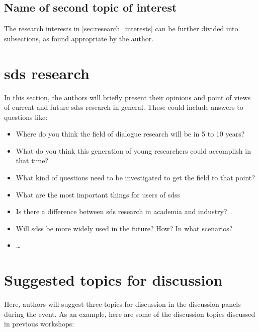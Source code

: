 \documentclass[10pt, a4paper]{article}
\begin{document}
\subsection{Name of second topic of interest}
\label{subsec:second_topic_of_interest}

The research interests in \cref{sec:research_interests} can be further divided into subsections, as found appropriate by the author.

\section{\Ac{sds} research}
\label{sec:sds_research}

In this section, the authors will briefly present their opinions and point of views of current and future \acp{sds} research in general.
These could include answers to questions like:

\begin{itemize}
	\item Where do you think the field of dialogue research will be in 5 to 10 years? 
	\item What do you think this generation of young researchers could accomplish in that time? 
	\item What kind of questions need to be investigated to get the field to that point?
	\item What are the most important things for users of \acp{sds}
	\item Is there a difference between \ac{sds} research in academia and industry?
	\item Will \acp{sds} be more widely used in the future? How? In what scenarios?
	\item \ldots
\end{itemize}

\section{Suggested topics for discussion}
\label{suggested_topics_for_discussion}

Here, authors will suggest three topics for discussion in the discussion panels during the event.
As an example, here are some of the discussion topics discussed
in previous workshops:
\end{document}
